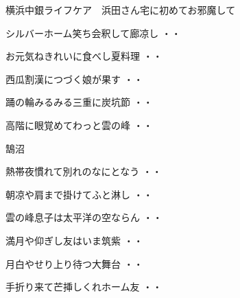 \vspace{0.6cm}
横浜中銀ライフケア　浜田さん宅に初めてお邪魔して
\begin{shiika}シルバーホーム笑ち会釈して廊凉し
\hfill{・・}\end{shiika}
\vspace{0.6cm}
\begin{shiika}お元気ねきれいに食べし夏料理
\hfill{・・}\end{shiika}
\vspace{0.6cm}
\begin{shiika}西瓜割漢につづく娘が果す
\hfill{・・}\end{shiika}
\vspace{0.6cm}
\begin{shiika}踊の輪みるみる三重に炭坑節
\hfill{・・}\end{shiika}
\vspace{0.6cm}
\begin{shiika}高階に眼覚めてわっと雲の峰
\hfill{・・}\end{shiika}
\vspace{0.6cm}
鵠沼
\begin{shiika}熱帯夜慣れて別れのなにとなう
\hfill{・・}\end{shiika}
\vspace{0.6cm}
\begin{shiika}朝凉や肩まで掛けてふと淋し
\hfill{・・}\end{shiika}
\vspace{0.6cm}
\begin{shiika}雲の峰息子は太平洋の空ならん
\hfill{・・}\end{shiika}
\vspace{0.6cm}
\begin{shiika}満月や仰ぎし友はいま筑紫
\hfill{・・}\end{shiika}
\vspace{0.6cm}
\begin{shiika}月白やせり上り待つ大舞台
\hfill{・・}\end{shiika}
\vspace{0.6cm}
\begin{shiika}手折り来て芒挿しくれホーム友
\hfill{・・}\end{shiika}
